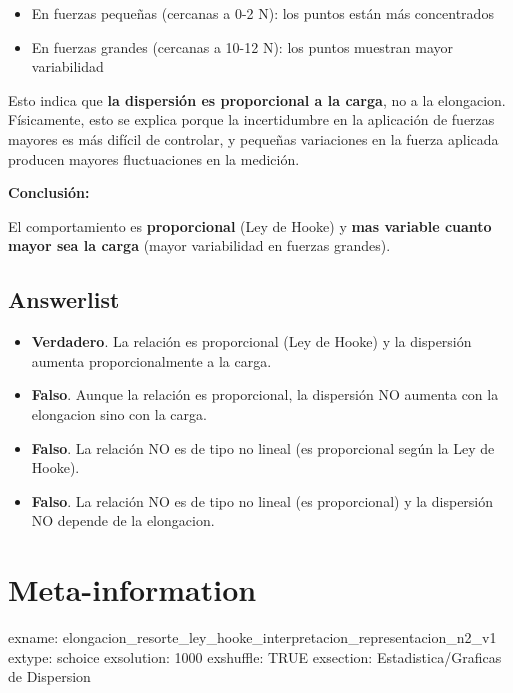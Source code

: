 \documentclass[
]{article}
\providecommand{\tightlist}{%
  \setlength{\itemsep}{0pt}\setlength{\parskip}{0pt}}
\begin{document}
\begin{itemize}
\tightlist
\item
  En fuerzas pequeñas (cercanas a 0-2 N): los puntos están más
  concentrados
\item
  En fuerzas grandes (cercanas a 10-12 N): los puntos muestran mayor
  variabilidad
\end{itemize}

Esto indica que \textbf{la dispersión es proporcional a la carga}, no a
la elongacion. Físicamente, esto se explica porque la incertidumbre en
la aplicación de fuerzas mayores es más difícil de controlar, y pequeñas
variaciones en la fuerza aplicada producen mayores fluctuaciones en la
medición.

\textbf{Conclusión:}

El comportamiento es \textbf{proporcional} (Ley de Hooke) y \textbf{mas
variable cuanto mayor sea la carga} (mayor variabilidad en fuerzas
grandes).

\subsection{Answerlist}\label{answerlist-1}

\begin{itemize}
\tightlist
\item
  \textbf{Verdadero}. La relación es proporcional (Ley de Hooke) y la
  dispersión aumenta proporcionalmente a la carga.
\item
  \textbf{Falso}. Aunque la relación es proporcional, la dispersión NO
  aumenta con la elongacion sino con la carga.
\item
  \textbf{Falso}. La relación NO es de tipo no lineal (es proporcional
  según la Ley de Hooke).
\item
  \textbf{Falso}. La relación NO es de tipo no lineal (es proporcional)
  y la dispersión NO depende de la elongacion.
\end{itemize}

\section{Meta-information}\label{meta-information}

exname:
elongacion\_resorte\_ley\_hooke\_interpretacion\_representacion\_n2\_v1
extype: schoice exsolution: 1000 exshuffle: TRUE exsection:
Estadistica/Graficas de Dispersion
\end{document}
